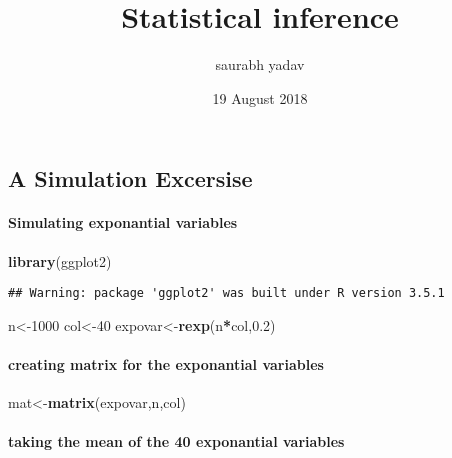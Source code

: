 \documentclass[]{article}
\title{Statistical inference}
\author{saurabh yadav}
\date{19 August 2018}
\newenvironment{Shaded}{\begin{snugshade}}{\end{snugshade}}
\newcommand{\KeywordTok}[1]{\textcolor[rgb]{0.13,0.29,0.53}{\textbf{#1}}}
\newcommand{\DecValTok}[1]{\textcolor[rgb]{0.00,0.00,0.81}{#1}}
\newcommand{\FloatTok}[1]{\textcolor[rgb]{0.00,0.00,0.81}{#1}}
\newcommand{\OperatorTok}[1]{\textcolor[rgb]{0.81,0.36,0.00}{\textbf{#1}}}
\newcommand{\NormalTok}[1]{#1}
\let\oldparagraph\paragraph
\renewcommand{\paragraph}[1]{\oldparagraph{#1}\mbox{}}
\begin{document}
\maketitle

\subsection{A Simulation Excersise}\label{a-simulation-excersise}

\paragraph{Simulating exponantial
variables}\label{simulating-exponantial-variables}

\begin{Shaded}
\begin{Highlighting}[]
\KeywordTok{library}\NormalTok{(ggplot2)}
\end{Highlighting}
\end{Shaded}

\begin{verbatim}
## Warning: package 'ggplot2' was built under R version 3.5.1
\end{verbatim}

\begin{Shaded}
\begin{Highlighting}[]
\NormalTok{n<-}\DecValTok{1000}
\NormalTok{col<-}\DecValTok{40}
\NormalTok{expovar<-}\KeywordTok{rexp}\NormalTok{(n}\OperatorTok{*}\NormalTok{col,}\FloatTok{0.2}\NormalTok{)}
\end{Highlighting}
\end{Shaded}

\paragraph{creating matrix for the exponantial
variables}\label{creating-matrix-for-the-exponantial-variables}

\begin{Shaded}
\begin{Highlighting}[]
\NormalTok{mat<-}\KeywordTok{matrix}\NormalTok{(expovar,n,col)}
\end{Highlighting}
\end{Shaded}

\paragraph{taking the mean of the 40 exponantial
variables}\label{taking-the-mean-of-the-40-exponantial-variables}
\end{document}
